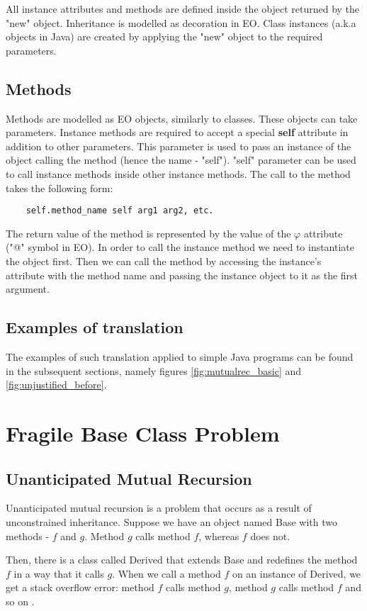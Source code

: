 All instance attributes and methods are defined inside the object returned by the "new" object. Inheritance is modelled as decoration in EO. Class instances (a.k.a objects in Java) are created
by applying the "new" object to the required parameters.

\subsection{Methods}
Methods are modelled as EO objects, similarly to classes. These objects can take parameters.
Instance methods are required to accept a special \textbf{self} attribute in addition to other parameters. This parameter is used to pass an instance of the object calling the method (hence the name - "self").
"self" parameter can be used to call instance methods inside other instance methods. The call to the method takes the following form:
\begin{lstlisting}
    self.method_name self arg1 arg2, etc.
\end{lstlisting}

The return value of the method is represented by the value of the $\varphi$ attribute ("@" symbol in EO). In order to call the instance method we need to instantiate the object first. Then we can call the method by accessing the instance's attribute with the method name and passing the instance object to it as the first argument.

\subsection{Examples of translation}
The examples of such translation applied to simple Java programs can be found in the subsequent sections, namely figures \ref{fig:mutualrec_basic} and \ref{fig:unjustified_before}.
\section{Fragile Base Class Problem}

\subsection{Unanticipated Mutual Recursion}
Unanticipated mutual recursion is a problem that occurs as a result of unconstrained inheritance. Suppose we have an object named Base with two methods - $f$ and $g$. Method $g$ calls method $f$, whereas $f$ does not.


Then, there is a class called Derived that extends Base and redefines the method $f$ in a way that it calls $g$. When we call a method $f$ on an instance of Derived, we get a stack overflow error: method $f$ calls method $g$, method $g$ calls method $f$ and so on .

